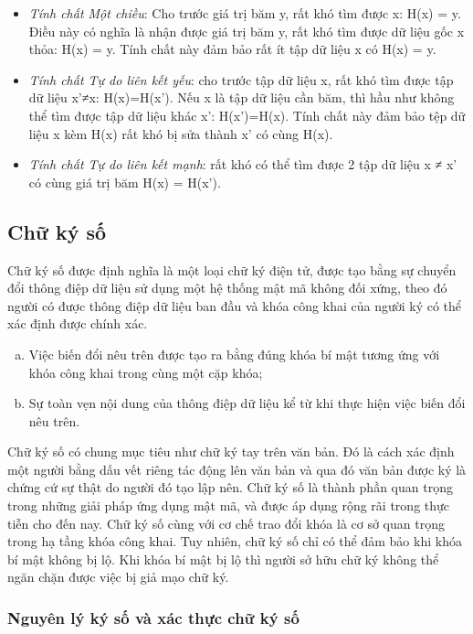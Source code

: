 \begin{itemize}
\item \emph{Tính chất Một chiều}: Cho trước giá trị băm y, rất khó tìm được x: H(x) = y. Điều này có nghĩa là nhận được giá trị băm y, rất khó tìm được dữ liệu gốc x thỏa: H(x) = y. Tính chất này đảm bảo rất ít tập dữ liệu x có H(x) = y.

\item \emph{Tính chất Tự do liên kết yếu}: cho trước tập dữ liệu x, rất khó tìm được tập dữ liệu x’≠x: H(x)=H(x’). Nếu x là tập dữ liệu cần băm, thì hầu như không thể tìm được tập dữ liệu khác x’: H(x’)=H(x). Tính chất này đảm bảo tệp dữ liệu x kèm H(x) rất khó bị sửa thành x’ có cùng H(x).

\item \emph{Tính chất Tự do liên kết mạnh}: rất khó có thể tìm được 2 tập dữ liệu x ≠ x’ có cùng giá trị băm H(x) = H(x’).
\end{itemize}

\subsection{Chữ ký số}
Chữ ký số được định nghĩa là một loại chữ ký điện tử, được tạo bằng sự chuyển đổi thông điệp dữ liệu sử dụng một hệ thống mật mã không đối xứng, theo đó người có được thông điệp dữ liệu ban đầu và khóa công khai của người ký có thể xác định được chính xác.

\begin{enumerate}[a)]
\item Việc biến đổi nêu trên được tạo ra bằng đúng khóa bí mật tương ứng với khóa công khai trong cùng một cặp khóa;
\item Sự toàn vẹn nội dung của thông điệp dữ liệu kể từ khi thực hiện việc biến đổi nêu trên.
\end{enumerate}

Chữ ký số có chung mục tiêu như chữ ký tay trên văn bản. Đó là cách xác định một người bằng dấu vết riêng tác động lên văn bản và qua đó văn bản được ký là chứng cứ sự thật do người đó tạo lập nên. Chữ ký số là thành phần quan trọng trong những giải pháp ứng dụng mật mã, và được áp dụng rộng rãi trong thực tiễn cho đến nay. Chữ ký số cùng với cơ chế trao đổi khóa là cơ sở quan trọng trong hạ tầng khóa công khai. Tuy nhiên, chữ ký số chỉ có thể đảm bảo khi khóa bí mật không bị lộ. Khi khóa bí mật bị lộ thì người sở hữu chữ ký không thể ngăn chặn được việc bị giả mạo chữ ký.

\subsubsection{Nguyên lý ký số và xác thực chữ ký số }

